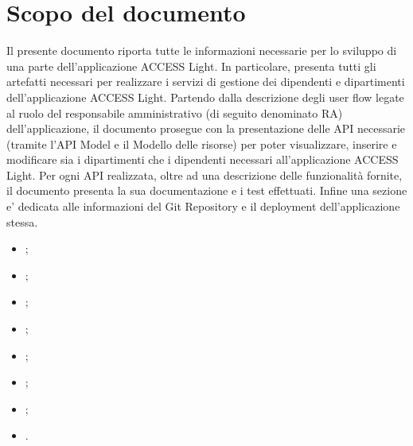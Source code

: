 \section*{Scopo del documento}

Il presente documento riporta tutte le informazioni necessarie per lo sviluppo di una parte dell'applicazione ACCESS Light. In particolare, presenta tutti gli artefatti necessari per realizzare i servizi di gestione dei dipendenti e dipartimenti dell'applicazione ACCESS Light.
Partendo dalla descrizione degli user flow legate al ruolo del responsabile amministrativo (di seguito denominato RA) dell'applicazione, il documento prosegue con la presentazione delle API necessarie (tramite l'API Model e il Modello delle risorse) per poter visualizzare, inserire e modificare sia i dipartimenti che i dipendenti necessari all'applicazione ACCESS Light.
Per ogni API realizzata, oltre ad una descrizione delle funzionalità fornite, il documento presenta la sua documentazione e i test effettuati. Infine una sezione e' dedicata alle informazioni del Git Repository e il deployment dell'applicazione stessa.

\begin{itemize}
    \item \hyperref[secD4:]{};
    \item \hyperref[secD4:]{};
    \item \hyperref[secD4:]{};
    \item \hyperref[secD4:]{};
    \item \hyperref[secD4:]{};
    \item \hyperref[secD4:]{};
    \item \hyperref[secD4:]{};
    \item \hyperref[secD4:]{}.
\end{itemize}
